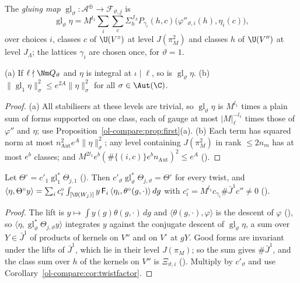 \begin{definition}\label{ol-compare:def:glue}
The \emph{gluing map} $\operatorname{gl}_\vartheta\colon\mathcal A^\oplus\to\mathcal F_{\vartheta,j}$ is
\[
\operatorname{gl}_\vartheta\eta=M^{l_1}\sum_i\sum_c\Sigma^{J_\Lambda}_hP_{\gamma_i}(h,c)\bigl(\varphi''_{\vartheta,i}(h),\eta_i(c)\bigr),
\]
over choices $i$, classes $c$ of $\U(V^\circ)$ at level $J(\pi_M^2)$ and classes $h$ of $\U(V'')$ at level
$J_\Lambda$; the lattices $\gamma_i$ are chosen once, for $\vartheta=1$.
\end{definition}

\begin{proposition}
\label{ol-compare:prop:glue}
(a) If $\ell\nmid\Nm Q_\vartheta$ and $\eta$ is integral at $\iota\mid\ell$, so is $\operatorname{gl}_\vartheta\eta$.
(b) $\|\operatorname{gl}_1\eta\|^2_\sigma\le e^{2A}\|\eta\|^2_\sigma$ for all $\sigma\in\Aut(\C)$.
\end{proposition}

\begin{proof}
(a) All stabilisers at these levels are trivial, so $\operatorname{gl}_\vartheta\eta$ is $M^{l_1}$ times a
plain sum of forms supported on one class, each of gauge at most $|M|_\ell^{-l_1}$ times those of
$\varphi''$ and $\eta$; use Proposition~\ref{ol-compare:prop:first}(a). (b) Each term has squared norm
at most $n_{\mathrm{Aut}}^2e^A\|\eta\|_\sigma^2$; any level containing $J(\pi_M^2)$ in rank $\le2n_m$
has at most $e^b$ classes; and $M^{2l_1}e^b(\#\{(i,c)\}e^bn_{\mathrm{Aut}})^2\le e^A$
().
\end{proof}

\begin{theorem}
\label{ol-compare:thm:seesaw}
Let $\Theta^\circ=c'_1\operatorname{gl}_1^*\Theta_{j,1}$ (). Then
$c'_\vartheta\operatorname{gl}_\vartheta^*\Theta_{j,\vartheta}=\Theta^\circ$ for every twist, and
$\langle\eta,\Theta^\circ y\rangle=\sum_ic^\circ_i\int_{[\U(W_j)]}y\,\mathsf F_i\,\langle\eta_i,\theta^\circ(g,\cdot)\rangle\,dg$
with $c^\circ_i=M^{l_1}c_{\gamma_i}\#\bar J^1c''\ne0$ ().
\end{theorem}

\begin{proof}
The lift is $y\mapsto\int y(g)\theta(g,\cdot)\,dg$ and $\langle\theta(g,\cdot),\varphi\rangle$ is the descent of $\varphi$
(), so $\langle\eta,\operatorname{gl}_\vartheta^*\Theta_{j,\vartheta}y\rangle$
integrates $y$ against the conjugate descent of $\operatorname{gl}_\vartheta\eta$, a sum over
$Y\in\bar J^1$ of products of kernels on $V''$ and on $V^\circ$ at $gY$. Good forms are invariant
under the lifts of $\bar J^1$, which lie in their level $J(\pi_M)$; so the sum gives $\#\bar J^1$, and the
class sum over $h$ of the kernels on $V''$ is $\Xi_{\vartheta,i}$
(). Multiply by $c'_\vartheta$ and use
Corollary~\ref{ol-compare:cor:twistfactor}.
\end{proof}

